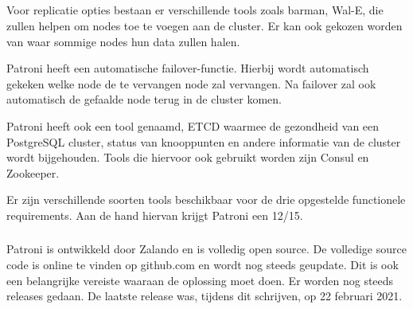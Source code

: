 





\subsection{}
\label{subsec: Oplossing 1: Patroni}


\subsubsection{}
\label{subsubsec:Functionele Requirements}

Voor replicatie opties bestaan er verschillende tools zoals barman, Wal-E, die zullen helpen om nodes toe te voegen aan de cluster. Er kan ook gekozen worden van waar sommige nodes hun data zullen halen.

Patroni heeft een automatische failover-functie. Hierbij wordt automatisch gekeken welke node de te vervangen node zal vervangen. Na failover zal ook automatisch de gefaalde node terug in de cluster komen.

Patroni heeft ook een tool genaamd, ETCD waarmee de gezondheid van een PostgreSQL cluster, status van knooppunten en andere informatie van de cluster wordt bijgehouden. Tools die hiervoor ook gebruikt worden zijn Consul en Zookeeper.

Er zijn verschillende soorten tools beschikbaar voor de drie opgestelde functionele requirements. Aan de hand hiervan krijgt Patroni een 12/15.

\subsubsection{}
\label{subsubsec:Niet-functionele Requirements}
Patroni is ontwikkeld door Zalando en is volledig open source. De volledige source code is online te vinden op github.com en wordt nog steeds geupdate. Dit is ook een belangrijke vereiste waaraan de oplossing moet doen. Er worden  nog steeds releases gedaan. De laatste release was, tijdens dit schrijven, op 22 februari 2021.

